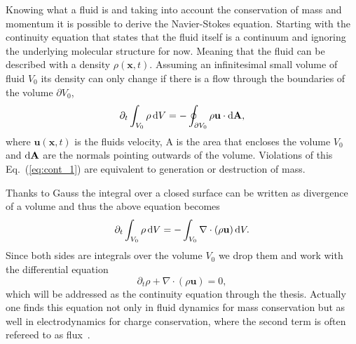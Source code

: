 Knowing what a fluid is and taking into account the conservation of mass and momentum it is possible to derive the Navier-Stokes equation. 
Starting with the continuity equation that states that the fluid itself is a continuum and ignoring the underlying molecular structure for now. 
Meaning that the fluid can be described with a density $\rho(\mathbf{x},t)$.
Assuming an infinitesimal small volume of fluid $V_0$ its density can only change if there is a flow through the boundaries of the volume $\partial V_0$,
\begin{equation}\label{eq:cont_1}
    \partial_t\int_{V_0}\rho\mathop{}\!\mathrm{d} V = -\oint_{\partial V_0} \rho\mathbf{u}\cdot\mathop{}\!\mathrm{d} \textbf{A}, 
\end{equation}
where $\mathbf{u}(\mathbf{x},t)$ is the fluids velocity, A is the area that encloses the volume $V_0$ and $\mathop{}\!\mathrm{d}\textbf{A}$ are the normals pointing outwards of the volume.
Violations of this Eq.~(\ref{eq:cont_1}) are equivalent to generation or destruction of mass.

Thanks to Gauss the integral over a closed surface can be written as divergence of a volume and thus the above equation becomes
\begin{equation}\label{eq:cont_2}
    \partial_t\int_{V_0}\rho\mathop{}\!\mathrm{d} V = -\int_{V_0} \nabla\cdot(\rho\mathbf{u}) \mathop{}\!\mathrm{d} V. 
\end{equation}
Since both sides are integrals over the volume $V_0$ we drop them and work with the differential equation
\begin{equation}\label{eq:cont_3}
    \partial_t\rho + \nabla\cdot(\rho\mathbf{u}) = 0,
\end{equation}
which will be addressed as the continuity equation through the thesis.
Actually one finds this equation not only in fluid dynamics for mass conservation but as well in electrodynamics for charge conservation, where the second term is often refereed to as flux~\cite{jackson1999classical, griffiths2005introduction}.

